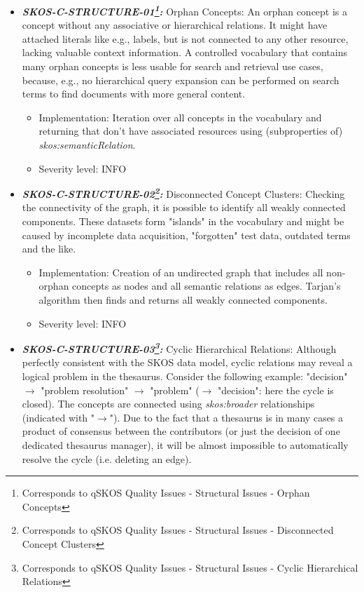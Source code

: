 \documentclass{llncs}
\begin{document}
\begin{itemize}
	\item \textbf{{\em SKOS-C-STRUCTURE-01\footnote{Corresponds to qSKOS Quality Issues - Structural Issues - Orphan Concepts}:}}
	Orphan Concepts:
  An orphan concept is a concept without any associative or hierarchical relations. It might have attached literals like e.g., labels, but is not connected to any other resource, lacking valuable context information. A controlled vocabulary that contains many orphan concepts is less usable for search and retrieval use cases, because, e.g., no hierarchical query expansion can be performed on search terms to find documents with more general content. 
	\begin{itemize}
		\item Implementation: Iteration over all concepts in the vocabulary and returning that don't have associated resources using (subproperties of) \emph{skos:semanticRelation}. 
		\item Severity level: INFO
\end{itemize}
	\item \textbf{{\em SKOS-C-STRUCTURE-02\footnote{Corresponds to qSKOS Quality Issues - Structural Issues - Disconnected Concept Clusters}:}}
	Disconnected Concept Clusters:
	Checking the connectivity of the graph, it is possible to identify all weakly connected components. These datasets form "islands" in the vocabulary and might be caused by incomplete data acquisition, "forgotten" test data, outdated terms and the like. 
	\begin{itemize}
		\item Implementation: Creation of an undirected graph that includes all non-orphan concepts as nodes and all semantic relations as edges. Tarjan's algorithm then finds and returns all weakly connected components.
		\item Severity level: INFO
\end{itemize}
	\item \textbf{{\em SKOS-C-STRUCTURE-03\footnote{Corresponds to qSKOS Quality Issues - Structural Issues - Cyclic Hierarchical Relations}:}}
	Cyclic Hierarchical Relations: 
	Although perfectly consistent with the SKOS data model, cyclic relations may reveal a logical problem in the thesaurus. Consider the following example: "decision" $\rightarrow$ "problem resolution" $\rightarrow$ "problem" ($\rightarrow$ "decision": here the cycle is closed). The concepts are connected using \emph{skos:broader} relationships (indicated with "$\rightarrow$"). Due to the fact that a thesaurus is in many cases a product of consensus between the contributors (or just the decision of one dedicated thesaurus manager), it will be almost impossible to automatically resolve the cycle (i.e. deleting an edge). 

\end{itemize}
\end{document}
